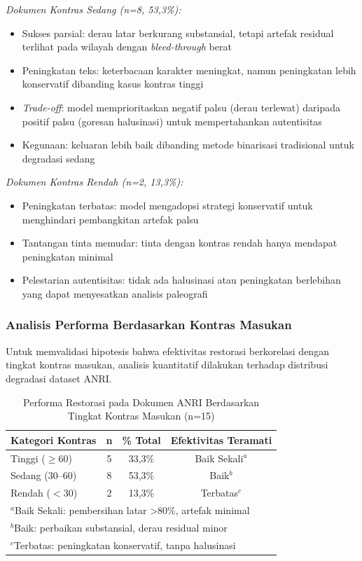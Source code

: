 \documentclass[journal]{IEEEtran}
\begin{document}
\textit{Dokumen Kontras Sedang (n=8, 53,3\%):}
\begin{itemize}
    \item Sukses parsial: derau latar berkurang substansial, tetapi artefak residual terlihat pada wilayah dengan \textit{bleed-through} berat
    \item Peningkatan teks: keterbacaan karakter meningkat, namun peningkatan lebih konservatif dibanding kasus kontras tinggi
    \item \textit{Trade-off}: model memprioritaskan negatif palsu (derau terlewat) daripada positif palsu (goresan halusinasi) untuk mempertahankan autentisitas
    \item Kegunaan: keluaran lebih baik dibanding metode binarisasi tradisional untuk degradasi sedang
\end{itemize}

\textit{Dokumen Kontras Rendah (n=2, 13,3\%):}
\begin{itemize}
    \item Peningkatan terbatas: model mengadopsi strategi konservatif untuk menghindari pembangkitan artefak palsu
    \item Tantangan tinta memudar: tinta dengan kontras rendah hanya mendapat peningkatan minimal
    \item Pelestarian autentisitas: tidak ada halusinasi atau peningkatan berlebihan yang dapat menyesatkan analisis paleografi
\end{itemize}

\subsubsection{Analisis Performa Berdasarkan Kontras Masukan}

Untuk memvalidasi hipotesis bahwa efektivitas restorasi berkorelasi dengan tingkat kontras masukan, analisis kuantitatif dilakukan terhadap distribusi degradasi dataset ANRI.

\begin{table}[!t]
\renewcommand{\arraystretch}{1.3}
\caption{Performa Restorasi pada Dokumen ANRI Berdasarkan Tingkat Kontras Masukan (n=15)}
\label{table:anri_contrast_analysis}
\centering
\small
\begin{tabular}{|l|c|c|c|}
\hline
\textbf{Kategori Kontras} & \textbf{n} & \textbf{\% Total} & \textbf{Efektivitas Teramati} \\
\hline
Tinggi ($\geq$60) & 5 & 33,3\% & Baik Sekali$^a$ \\
Sedang (30--60) & 8 & 53,3\% & Baik$^b$ \\
Rendah ($<$30) & 2 & 13,3\% & Terbatas$^c$ \\
\hline
\multicolumn{4}{l}{\footnotesize $^a$Baik Sekali: pembersihan latar >80\%, artefak minimal} \\
\multicolumn{4}{l}{\footnotesize $^b$Baik: perbaikan substansial, derau residual minor} \\
\multicolumn{4}{l}{\footnotesize $^c$Terbatas: peningkatan konservatif, tanpa halusinasi} \\
\end{tabular}
\end{table}
\end{document}
